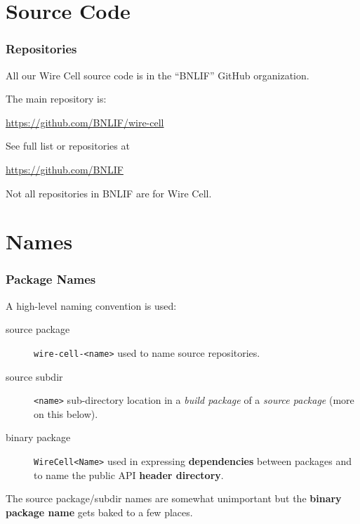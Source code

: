 \documentclass[xcolor=dvipsnames]{beamer}
\begin{document}





\section{Source Code}

\begin{frame}
  \frametitle{Repositories}

  All our Wire Cell source code is in the ``BNLIF'' GitHub organization.

  \vspace{3mm}

  The main repository is:
  \begin{center}
    \url{https://github.com/BNLIF/wire-cell}
  \end{center}
  
  See full list or repositories at

  \begin{center}
    \url{https://github.com/BNLIF}    
  \end{center}

  Not all repositories in BNLIF are for Wire Cell.
\end{frame}

\section{Names}

\begin{frame}[fragile]
\end{frame}

\begin{frame}
  \frametitle{Package Names}

  A high-level naming convention is used:

  \begin{description}
  \item[source package] \texttt{wire-cell-<name>} used to name source repositories.
  \item[source subdir] \texttt{<name>} sub-directory location in a \textit{build
    package} of a \textit{source package} (more on this below).
  \item[binary package] \texttt{WireCell<Name>} used in expressing
    \textbf{dependencies} between packages and to name the public API
    \textbf{header directory}.
  \end{description}

  The source package/subdir names are somewhat unimportant but the
  \textbf{binary package name} gets baked to a few places.
\end{frame}
\end{document}
